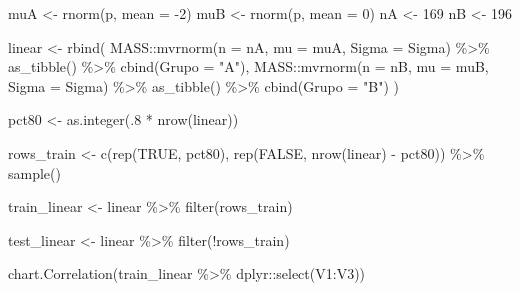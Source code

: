 \documentclass[
  a4paperpaper,
]{article}
\newenvironment{Shaded}{\begin{snugshade}}{\end{snugshade}}
\newcommand{\AttributeTok}[1]{\textcolor[rgb]{0.40,0.45,0.13}{#1}}
\newcommand{\ConstantTok}[1]{\textcolor[rgb]{0.56,0.35,0.01}{#1}}
\newcommand{\DecValTok}[1]{\textcolor[rgb]{0.68,0.00,0.00}{#1}}
\newcommand{\FunctionTok}[1]{\textcolor[rgb]{0.28,0.35,0.67}{#1}}
\newcommand{\NormalTok}[1]{\textcolor[rgb]{0.00,0.23,0.31}{#1}}
\newcommand{\OtherTok}[1]{\textcolor[rgb]{0.00,0.23,0.31}{#1}}
\newcommand{\SpecialCharTok}[1]{\textcolor[rgb]{0.37,0.37,0.37}{#1}}
\newcommand{\StringTok}[1]{\textcolor[rgb]{0.13,0.47,0.30}{#1}}
\begin{document}
\begin{Shaded}
\begin{Highlighting}[]
\NormalTok{muA }\OtherTok{\textless{}{-}} \FunctionTok{rnorm}\NormalTok{(p, }\AttributeTok{mean =} \SpecialCharTok{{-}}\DecValTok{2}\NormalTok{)}
\NormalTok{muB }\OtherTok{\textless{}{-}} \FunctionTok{rnorm}\NormalTok{(p, }\AttributeTok{mean =} \DecValTok{0}\NormalTok{)}
\NormalTok{nA }\OtherTok{\textless{}{-}} \DecValTok{169}
\NormalTok{nB }\OtherTok{\textless{}{-}} \DecValTok{196}

\NormalTok{linear }\OtherTok{\textless{}{-}} \FunctionTok{rbind}\NormalTok{(}
\NormalTok{    MASS}\SpecialCharTok{::}\FunctionTok{mvrnorm}\NormalTok{(}\AttributeTok{n =}\NormalTok{ nA, }\AttributeTok{mu =}\NormalTok{ muA, }\AttributeTok{Sigma =}\NormalTok{ Sigma) }\SpecialCharTok{\%\textgreater{}\%}
      \FunctionTok{as\_tibble}\NormalTok{() }\SpecialCharTok{\%\textgreater{}\%}
      \FunctionTok{cbind}\NormalTok{(}\AttributeTok{Grupo =} \StringTok{"A"}\NormalTok{),}
\NormalTok{    MASS}\SpecialCharTok{::}\FunctionTok{mvrnorm}\NormalTok{(}\AttributeTok{n =}\NormalTok{ nB, }\AttributeTok{mu =}\NormalTok{ muB, }\AttributeTok{Sigma =}\NormalTok{ Sigma) }\SpecialCharTok{\%\textgreater{}\%}
      \FunctionTok{as\_tibble}\NormalTok{() }\SpecialCharTok{\%\textgreater{}\%}
      \FunctionTok{cbind}\NormalTok{(}\AttributeTok{Grupo =} \StringTok{"B"}\NormalTok{)}
\NormalTok{)}

\NormalTok{pct80 }\OtherTok{\textless{}{-}} \FunctionTok{as.integer}\NormalTok{(.}\DecValTok{8} \SpecialCharTok{*} \FunctionTok{nrow}\NormalTok{(linear))}

\NormalTok{rows\_train }\OtherTok{\textless{}{-}} \FunctionTok{c}\NormalTok{(}\FunctionTok{rep}\NormalTok{(}\ConstantTok{TRUE}\NormalTok{, pct80), }\FunctionTok{rep}\NormalTok{(}\ConstantTok{FALSE}\NormalTok{, }\FunctionTok{nrow}\NormalTok{(linear) }\SpecialCharTok{{-}}\NormalTok{ pct80)) }\SpecialCharTok{\%\textgreater{}\%}
  \FunctionTok{sample}\NormalTok{()}

\NormalTok{train\_linear }\OtherTok{\textless{}{-}}\NormalTok{ linear }\SpecialCharTok{\%\textgreater{}\%}
  \FunctionTok{filter}\NormalTok{(rows\_train)}

\NormalTok{test\_linear }\OtherTok{\textless{}{-}}\NormalTok{ linear }\SpecialCharTok{\%\textgreater{}\%}
  \FunctionTok{filter}\NormalTok{(}\SpecialCharTok{!}\NormalTok{rows\_train)}

\FunctionTok{chart.Correlation}\NormalTok{(train\_linear }\SpecialCharTok{\%\textgreater{}\%}\NormalTok{ dplyr}\SpecialCharTok{::}\FunctionTok{select}\NormalTok{(V1}\SpecialCharTok{:}\NormalTok{V3))}
\end{Highlighting}
\end{Shaded}
\end{document}
